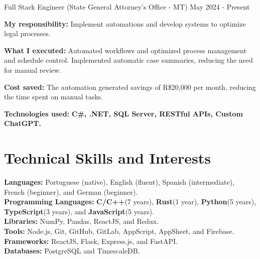 \vspace{-2mm}

\resumeSubheading
{ Full Stack Engineer \textmd{(State General Attorney's Office - MT)}}{}
{}{May 2024 - Present}
\vspace{-2.0mm}
\resumeItemListStart
\item \textbf{My responsibility:} Implement automations and develop systems to optimize legal processes.
\item \textbf{What I executed:} Automated workflows and optimized process management and schedule control. Implemented automatic case summaries, reducing the need for manual review.
\item \textbf{Cost saved:} The automation generated savings of R\$20,000 per month, reducing the time spent on manual tasks.
\item \textbf{Technologies used:} \textbf{C\#, .NET, SQL Server, RESTful APIs, Custom ChatGPT.}
\resumeItemListEnd

\vspace{-5.5mm}
\resumeSubHeadingListEnd

\section{\textbf{Technical Skills and Interests}}
\begin{itemize}[leftmargin=0.05in, label={}]
    \small{\item{
          \textbf{Languages:}{ Portuguese (native), English (fluent), Spanish (intermediate), French (beginner), and German (beginner).} \\
          \textbf{Programming Languages:}{ \textbf{C/C++}(7 years), \textbf{Rust}(1 year), \textbf{Python}(5 years), \textbf{TypeScript}(3 years), and \textbf{JavaScript}(5 years). } \\
          \textbf{Libraries:}{ NumPy, Pandas, ReactJS, and Redux. }\\
          \textbf{Tools:}{ Node.js, Git, GitHub, GitLab, AppScript, AppSheet, and Firebase.} \\
          \textbf{Frameworks:}{ ReactJS, Flask, Express.js, and FastAPI. } \\
          \textbf{Databases:}{ PostgreSQL and TimescaleDB. } \\
          }}
\end{itemize}


